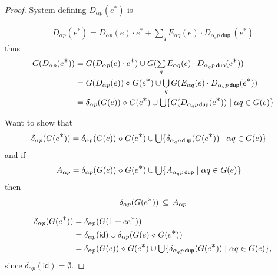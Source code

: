 \documentclass{article}
\renewcommand\smash{\mathrel{\diamond}}
\newcommand\ssum{\mathop{\textstyle\sum}}
\newcommand\pdup{\mathop{\mathsf{dup}}}
\renewcommand\star{^{\textstyle *}}
\newcommand\id{\mathsf{id}}
\newcommand\sbigcup{\mathop{\textstyle\bigcup}}
\begin{document}
\begin{proof}
System defining $D_{\alpha p}(e\star)$ is

\begin{align*}
D_{\alpha p}(e\star) = D_{\alpha p}(e)\cdot e\star + \ssum_{q} E_{\alpha q}(e)\cdot D_{\alpha_qp\pdup}(e\star)
\end{align*}
thus
\begin{align*}
G(D_{\alpha p}(e\star))
&= G(D_{\alpha p}(e)\cdot e\star) \cup G(\ssum_{q}E_{\alpha q}(e)\cdot D_{\alpha_q p\pdup}(e\star))\\
&= G(D_{\alpha p}(e))\smash G(e\star) \cup \sbigcup_q G(E_{\alpha q}(e)\cdot D_{\alpha_q p\pdup}(e\star))\\
&= \delta_{\alpha p}(G(e))\smash G(e\star) \cup \sbigcup \set{G(D_{\alpha_q p\pdup}(e\star))}{\alpha q\in G(e)}\\
\end{align*}

Want to show that
\begin{align*}
\delta_{\alpha p}(G(e\star))
&= \delta_{\alpha p}(G(e))\smash G(e\star) \cup \sbigcup \set{\delta_{\alpha_q p\pdup}(G(e\star))}{\alpha q\in G(e)}
\end{align*}
and if
\begin{align*}
A_{\alpha p}
&= \delta_{\alpha p}(G(e))\smash G(e\star) \cup \sbigcup \set{A_{\alpha_q p\pdup}}{\alpha q\in G(e)}
\end{align*}
then
\begin{align*}
\delta_{\alpha p}(G(e\star)) \subs A_{\alpha p}
\end{align*}

\begin{align*}
\delta_{\alpha p}(G(e\star))
&= \delta_{\alpha p}(G(1+ee\star))\\
&= \delta_{\alpha p}(\id) \cup \delta_{\alpha p}(G(e)\smash G(e\star))\\
&= \delta_{\alpha p}(G(e))\smash G(e\star) \cup \sbigcup \set{\delta_{\alpha_q p\pdup}(G(e\star))}{\alpha q\in G(e)},
\end{align*}
since $\delta_{\alpha p}(\id) = \emptyset$.


\end{proof}
\end{document}
